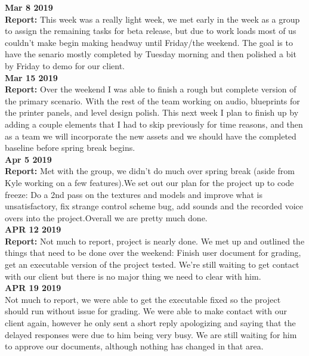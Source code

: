 \textbf{Mar 8 2019}\\
\textbf{Report:} 
This week was a really light week, we met early in the week as a group to assign the remaining tasks for beta release, but due to work loads most of us couldn't make begin making headway until Friday/the weekend. The goal is to have the senario mostly completed by Tuesday morning and then polished a bit by Friday to demo for our client. \\

\textbf{Mar 15 2019}\\
\textbf{Report:}
Over the weekend I was able to finish a rough but complete version of the primary scenario. With the rest of the team working on audio, blueprints for the printer panels, and level design polish. This next week I plan to finish up by adding a couple elements that I had to skip previously for time reasons, and then as a team we will incorporate the new assets and we should have the completed baseline before spring break begins. \\

\textbf{Apr 5 2019}\\
\textbf{Report:} 
 Met with the group, we didn’t do much over spring break (aside from Kyle working on a few features).We set out our plan for the project up to code freeze: Do a 2nd pass on the textures and models and improve what is unsatisfactory, fix strange control scheme bug, add sounds and the recorded voice overs into the project.Overall we are pretty much done.\\

\textbf{APR 12 2019}\\
\textbf{Report:} 
 Not much to report, project is nearly done. We met up and outlined the things that need to be done over the weekend: Finish user document for grading, get an executable version of the project tested. We’re still waiting to get contact with our client but there is no major thing we need to clear with him.\\

\textbf{APR 19 2019}\\
Not much to report, we were able to get the executable fixed so the project should run without issue for grading. We were able to make contact with our client again, however he only sent a short reply apologizing and saying that the delayed responses were due to him being very busy. We are still waiting for him to approve our documents, although nothing has changed in that area.\\


